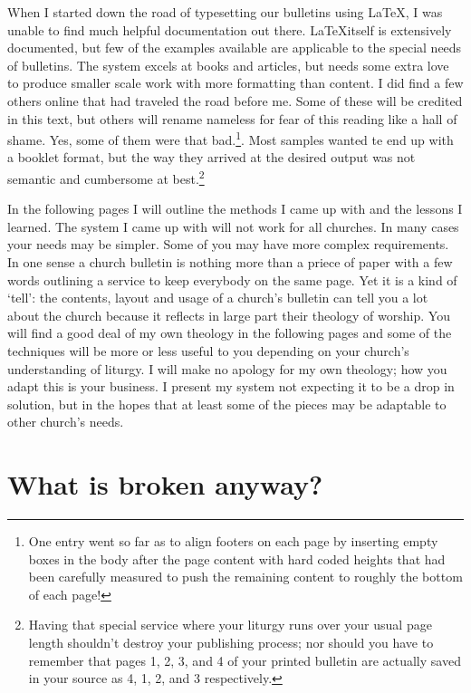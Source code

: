 \documentclass[12pt]{scrartcl}
\begin{document}
When I started down the road of typesetting our bulletins using \LaTeX, I was
unable to find much helpful documentation out there. \LaTeX itself is
extensively documented, but few of the examples available are applicable to the
special needs of bulletins. The system excels at books and articles, but needs
some extra love to produce smaller scale work with more formatting than content.
I did find a few others online that had traveled the road before me. Some of
these will be credited in this text, but others will rename nameless for fear of
this reading like a hall of shame. Yes, some of them were that bad.\footnote{One
	entry went so far as to align footers on each page by inserting empty
	boxes in the body after the page content with hard coded heights that
	had been carefully measured to push the remaining content to roughly the
	bottom of each page!}. Most samples wanted te end up with a booklet
format, but the way they arrived at the desired output was not semantic and
cumbersome at best.\footnote{Having that special service where your liturgy runs
	over your usual page length shouldn't destroy your publishing process;
	nor should you have to remember that pages 1, 2, 3, and 4 of your
	printed bulletin are actually saved in your source as 4, 1, 2, and 3
	respectively.}

In the following pages I will outline the methods I came up with and the lessons
I learned. The system I came up with will not work for all churches. In many
cases your needs may be simpler. Some of you may have more complex requirements.
In one sense a church bulletin is nothing more than a priece of paper with a few
words outlining a service to keep everybody on the same page. Yet it is a kind
of `tell': the contents, layout and usage of a church's bulletin can tell you a
lot about the church because it reflects in large part their theology of
worship. You will find a good deal of my own theology in the following pages and
some of the techniques will be more or less useful to you depending on your
church's understanding of liturgy. I will make no apology for my own theology;
how you adapt this is your business. I present my system not expecting it to be
a drop in solution, but in the hopes that at least some of the pieces may be
adaptable to other church's needs.

\tableofcontents


\section{What is broken anyway?}
\end{document}
